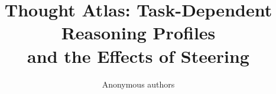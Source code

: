 \documentclass[11pt]{article}
\title{Thought Atlas: Task-Dependent Reasoning Profiles\\and the Effects of Steering}
\author{Anonymous authors}
\begin{document}
\maketitle






\FloatBarrier


\clearpage
\appendix



\end{document}
